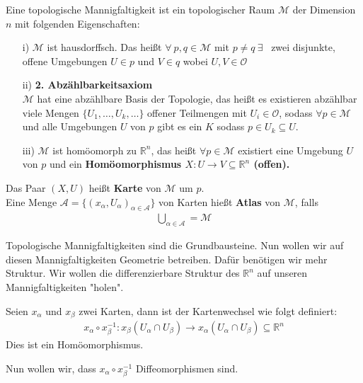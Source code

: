 \begin{defs}
Eine topologische Mannigfaltigkeit ist ein topologischer Raum $\mathcal{M}$ der Dimension $n$ mit folgenden Eigenschaften:
\begin{enumerate}
	\item[i)] $\mathcal{M}$ ist hausdorffsch. Das heißt $\forall \ p, q \in \mathcal{M}$ mit $p \neq q \  \exists$ \ zwei disjunkte, offene Umgebungen $U \in p$ und $V \in q$ wobei $U, V \in \mathcal{O}$
	\item[ii)] \textbf{2. Abzählbarkeitsaxiom}  \\
	$\mathcal{M}$ hat eine abzählbare Basis der Topologie, das heißt es existieren abzählbar viele Mengen $\{U_1, \dots, U_k, \dots\}$ offener Teilmengen mit $U_i \in \mathcal{O}$, sodass $\forall p \in \mathcal{M}$ und alle Umgebungen $U$ von $p$ gibt es ein $K$ sodass $p \in U_k \subseteq U$.
	\item [iii)] $\mathcal{M}$ ist homöomorph zu $\mathbb{R}^n$, das heißt $\forall p \in \mathcal{M}$ existiert eine Umgebung $U$ von $p$ und ein \bfseries Homöomorphismus \normalfont $X: U \rightarrow V \subseteq \mathbb{R}^n$ (offen).
\end{enumerate} 
\end{defs}

\begin{defs}
Das Paar $(X, U)$ heißt \textbf{Karte} von $\mathcal{M}$ um $p$. \\
Eine Menge $\mathcal{A} = \{(x_{\alpha},U_{\alpha})_{\alpha \in \mathcal{A}}\}$ von Karten hießt \textbf{Atlas} von $\mathcal{M}$, falls \\
\begin{align}
\bigcup\limits_{\alpha \in \mathcal{A}} = \mathcal{M}
\end{align}
\end{defs}

Topologische Mannigfaltigkeiten sind die Grundbausteine. Nun wollen wir auf diesen Mannigfaltigkeiten Geometrie betreiben. Dafür benötigen wir mehr Struktur. Wir wollen die differenzierbare Struktur des $\mathbb{R}^n$ auf unseren Mannigfaltigkeiten "holen".

\begin{defs}[Kartenwechsel]
Seien $x_{\alpha}$ und $x_{\beta}$ zwei Karten, dann ist der Kartenwechsel wie folgt definiert: \\
\begin{align}
x_{\alpha}\circ x_{\beta}^{-1}: x_{\beta}(U_{\alpha}\cap U_{\beta}) \rightarrow x_{\alpha}(U_{\alpha}\cap U_{\beta}) \subseteq \mathbb{R}^n
\end{align}
Dies ist ein Homöomorphismus.
\end{defs}
Nun wollen wir, dass $x_{\alpha}\circ x_{\beta}^{-1}$ Diffeomorphismen sind.

